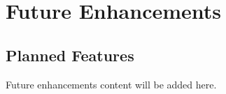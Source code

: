 \chapter{Future Enhancements}
\section{Planned Features}
Future enhancements content will be added here.
